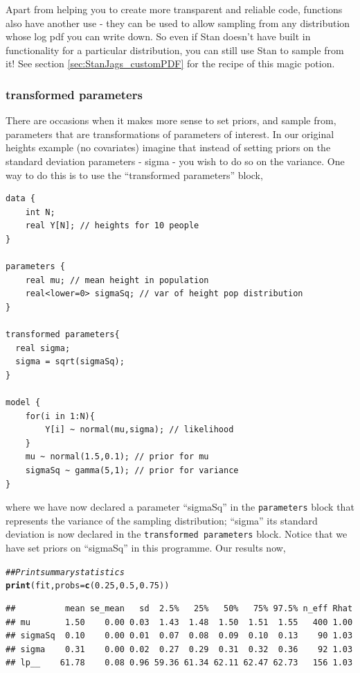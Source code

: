 \documentclass[11pt,fullpage]{book}
\makeatletter
\newenvironment{kframe}{%
	\def\at@end@of@kframe{}%
	\ifinner\ifhmode%
	\def\at@end@of@kframe{\end{minipage}}%
\begin{minipage}{\columnwidth}%
	\fi\fi%
	\def\FrameCommand##1{\hskip\@totalleftmargin \hskip-\fboxsep
		\colorbox{shadecolor}{##1}\hskip-\fboxsep
		\hskip-\linewidth \hskip-\@totalleftmargin \hskip\columnwidth}%
	\MakeFramed {\advance\hsize-\width
		\@totalleftmargin\z@ \linewidth\hsize
		\@setminipage}}%
{\par\unskip\endMakeFramed%
	\at@end@of@kframe}
\newcommand{\hlnum}[1]{\textcolor[rgb]{0.686,0.059,0.569}{#1}}%
\newcommand{\hlcom}[1]{\textcolor[rgb]{0.678,0.584,0.686}{\textit{#1}}}%
\newcommand{\hlstd}[1]{\textcolor[rgb]{0.345,0.345,0.345}{#1}}%
\newcommand{\hlkwc}[1]{\textcolor[rgb]{0.333,0.667,0.333}{#1}}%
\newcommand{\hlkwd}[1]{\textcolor[rgb]{0.737,0.353,0.396}{\textbf{#1}}}%
\newenvironment{knitrout}{}{} %
\makeatother
\begin{document}
Apart from helping you to create more transparent and reliable code, functions also have another use - they can be used to allow sampling from any distribution whose log pdf you can write down. So even if Stan doesn't have built in functionality for a particular distribution, you can still use Stan to sample from it! See section \ref{sec:StanJags_customPDF} for the recipe of this magic potion.

\subsubsection{transformed parameters}
There are occasions when it makes more sense to set priors, and sample from, parameters that are transformations of parameters of interest. In our original heights example (no covariates) imagine that instead of setting priors on the standard deviation parameters - sigma - you wish to do so on the variance. One way to do this is to use the ``transformed parameters'' block,

\begin{verbatim}
data {
    int N;
    real Y[N]; // heights for 10 people
}

parameters {
    real mu; // mean height in population
    real<lower=0> sigmaSq; // var of height pop distribution
}

transformed parameters{
  real sigma;
  sigma = sqrt(sigmaSq);
}

model {
    for(i in 1:N){
        Y[i] ~ normal(mu,sigma); // likelihood
    }
    mu ~ normal(1.5,0.1); // prior for mu
    sigmaSq ~ gamma(5,1); // prior for variance
}
\end{verbatim}
where we have now declared a parameter ``sigmaSq'' in the \texttt{parameters} block that represents the variance of the sampling distribution; ``sigma'' its standard deviation is now declared in the \texttt{transformed parameters} block. Notice that we have set priors on ``sigmaSq'' in this programme. Our results now,

\begin{knitrout}\small
		\color{fgcolor}\begin{kframe}
			\begin{alltt}
				\hlcom{## Print summary statistics}
				\hlkwd{print}\hlstd{(fit,}\hlkwc{probs} \hlstd{=} \hlkwd{c}\hlstd{(}\hlnum{0.25}\hlstd{,} \hlnum{0.5}\hlstd{,} \hlnum{0.75}\hlstd{))}
			\end{alltt}
			\begin{verbatim}
##          mean se_mean   sd  2.5%   25%   50%   75% 97.5% n_eff Rhat
## mu       1.50    0.00 0.03  1.43  1.48  1.50  1.51  1.55   400 1.00
## sigmaSq  0.10    0.00 0.01  0.07  0.08  0.09  0.10  0.13    90 1.03
## sigma    0.31    0.00 0.02  0.27  0.29  0.31  0.32  0.36    92 1.03
## lp__    61.78    0.08 0.96 59.36 61.34 62.11 62.47 62.73   156 1.03
			\end{verbatim}
		\end{kframe}
	\end{knitrout}
\end{document}
